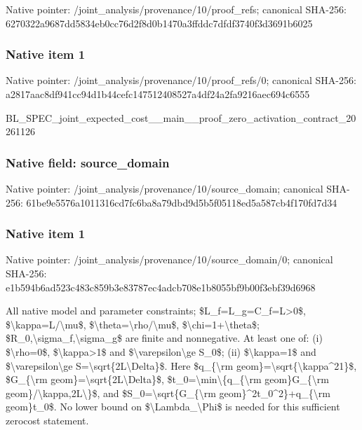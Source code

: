 \documentclass[10pt,a4paper]{article}
\begin{document}
Native pointer: /joint\_analysis/provenan\allowbreak{}ce/10/proof\_refs; canonical SHA-256: 6270322a9687dd5834eb0cc7\allowbreak{}6d2f8d0b1470a3ffddc7dfdf\allowbreak{}3740f3d3691b6025



\subsubsection{Native item 1}


Native pointer: /joint\_analysis/provenan\allowbreak{}ce/10/proof\_refs/0; canonical SHA-256: a2817aac8df941cc94d1b44c\allowbreak{}efc147512408527a4df24a2f\allowbreak{}a9216aec694c6555


BL\_SPEC\_joint\_expected\_c\allowbreak{}ost\_\_main\_\_proof\_zero\_ac\allowbreak{}tivation\_contract\_202611\allowbreak{}26


\subsubsection{Native field: source\_domain}


Native pointer: /joint\_analysis/provenan\allowbreak{}ce/10/source\_domain; canonical SHA-256: 61be9e5576a1011316cd7fc6\allowbreak{}ba8a79dbd9d5b5f05118ed5a\allowbreak{}587cb4f170fd7d34



\subsubsection{Native item 1}


Native pointer: /joint\_analysis/provenan\allowbreak{}ce/10/source\_domain/0; canonical SHA-256: e1b594b6ad523c483c859b3e\allowbreak{}83787ec4adcb708e1b8055bf\allowbreak{}9b00f3ebf39d6968


All native model and parameter constraints; \$L\_f=L\_g=C\_f=L>0\$, \$\textbackslash{}kappa=L/\textbackslash{}mu\$, \$\textbackslash{}theta=\textbackslash{}rho/\textbackslash{}mu\$, \$\textbackslash{}chi=1+\textbackslash{}theta\$; \$R\_0,\textbackslash{}sigma\_f,\textbackslash{}sigma\_g\$ are finite and nonnegative. At least one of: (i) \$\textbackslash{}rho=0\$, \$\textbackslash{}kappa>1\$ and \$\textbackslash{}varepsilon\textbackslash{}ge S\_0\$; (ii) \$\textbackslash{}kappa=1\$ and \$\textbackslash{}varepsilon\textbackslash{}ge S=\textbackslash{}sqrt\{2L\textbackslash{}Delta\}\$. Here \$q\_\{\textbackslash{}rm geom\}=\textbackslash{}sqrt\{\textbackslash{}kappa\textasciicircum{}21\}\$, \$G\_\{\textbackslash{}rm geom\}=\textbackslash{}sqrt\{2L\textbackslash{}Delta\}\$, \$t\_0=\textbackslash{}min\textbackslash{}\{q\_\{\textbackslash{}rm geom\}G\_\{\textbackslash{}rm geom\}/\textbackslash{}kappa,2L\textbackslash{}\}\$, and \$S\_0=\textbackslash{}sqrt\{G\_\{\textbackslash{}rm geom\}\textasciicircum{}2t\_0\textasciicircum{}2\}+q\_\{\textbackslash{}rm geom\}t\_0\$. No lower bound on \$\textbackslash{}Lambda\_\textbackslash{}Phi\$ is needed for this sufficient zerocost statement.
\end{document}
